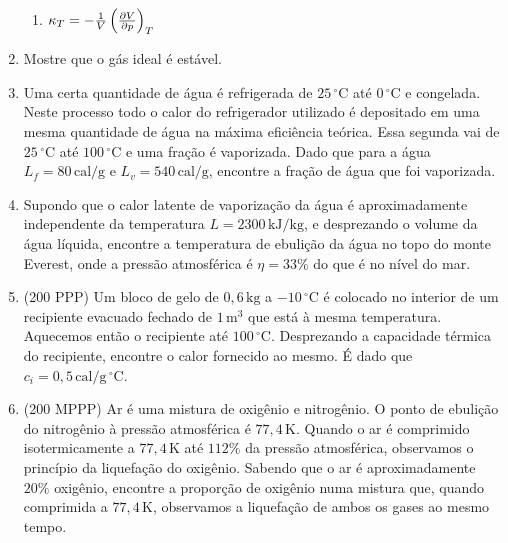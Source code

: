 \begin{enumerate}
\begin{enumerate}
            \item $\kappa_T=-\frac{1}{V}\pd{V}{p}{T}$
        \end{enumerate}
    \item
        Mostre que o gás ideal é estável.
    \item
        Uma certa quantidade de água é refrigerada de $25\,\mathrm{^\circ C}$
        até $0\,\mathrm{^\circ C}$ e congelada. Neste processo todo o calor
        do refrigerador utilizado é depositado em uma mesma quantidade de água
        na máxima eficiência teórica. Essa segunda vai de $25\,\mathrm{^\circ C}
        $ até $100\,\mathrm{^\circ C}$ e uma fração é vaporizada. Dado que para
        a água $L_f=80\,\mathrm{cal/g}$ e $L_v=540\,\mathrm{cal/g}$, encontre a
        fração de água que foi vaporizada.
    \item
        Supondo que o calor latente de vaporização da água é aproximadamente
        independente da temperatura $L=2300\,\mathrm{kJ/kg}$, e desprezando o
        volume da água líquida, encontre a temperatura de ebulição da água no
        topo do monte Everest, onde a pressão atmosférica é $\eta=33\%$ do que é
        no nível do mar.
    \item
        (200 PPP) Um bloco de gelo de $0{,}6\,\mathrm{kg}$ a $-10\,\mathrm{^
        \circ C}$ é colocado no interior de um recipiente evacuado fechado de
        $1\,\mathrm{m^3}$ que está à mesma temperatura. Aquecemos então o
        recipiente até $100\,\mathrm{^\circ C}$. Desprezando a capacidade
        térmica do recipiente, encontre o calor fornecido ao mesmo. É dado que
        $c_i=0{,}5\,\mathrm{cal/g\,^\circ C}$.
    \item 
        (200 MPPP) Ar é uma mistura de oxigênio e nitrogênio. O ponto de
        ebulição do nitrogênio à pressão atmosférica é $77{,}4\,\mathrm K$. 
        Quando o ar é comprimido isotermicamente a $77{,}4\,\mathrm K$ até 
        $112\%$ da pressão atmosférica, observamos o princípio da liquefação do
        oxigênio. Sabendo que o ar é aproximadamente $20\%$ oxigênio, encontre a
        proporção de oxigênio numa mistura que, quando comprimida a 
        $77{,}4\,\mathrm K$, observamos a liquefação de ambos os gases ao mesmo
        tempo.


\end{enumerate}
